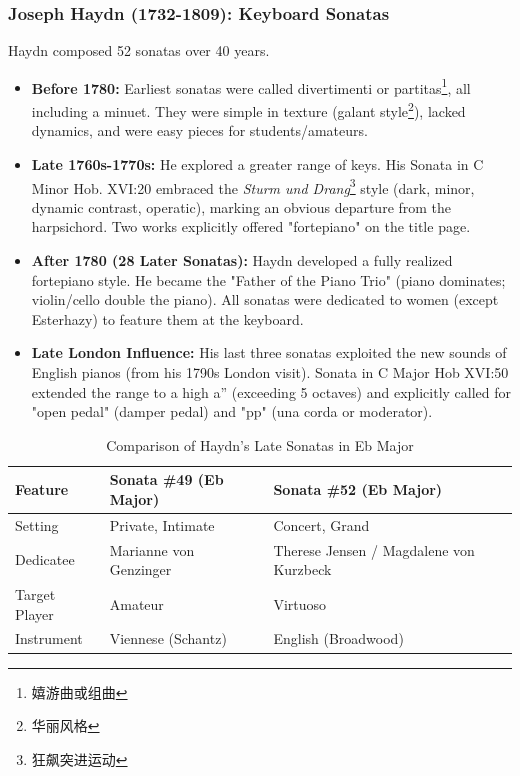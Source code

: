 \documentclass[math,code]{amznotes}
\theoremstyle{remark}
\begin{document}
\subsubsection{Joseph Haydn (1732-1809): Keyboard Sonatas}
Haydn composed 52 sonatas over 40 years.
\begin{itemize}
    \item \textbf{Before 1780:} Earliest sonatas were called divertimenti or partitas\footnote{嬉游曲或组曲}, all including a minuet. They were simple in texture (galant style\footnote{华丽风格}), lacked dynamics, and were easy pieces for students/amateurs.
    \item \textbf{Late 1760s-1770s:} He explored a greater range of keys. His Sonata in C Minor Hob. XVI:20 embraced the \textit{Sturm und Drang}\footnote{狂飙突进运动} style (dark, minor, dynamic contrast, operatic), marking an obvious departure from the harpsichord. Two works explicitly offered "fortepiano" on the title page.
    \item \textbf{After 1780 (28 Later Sonatas):} Haydn developed a fully realized fortepiano style. He became the "Father of the Piano Trio" (piano dominates; violin/cello double the piano). All sonatas were dedicated to women (except Esterhazy) to feature them at the keyboard.
    \item \textbf{Late London Influence:} His last three sonatas exploited the new sounds of English pianos (from his 1790s London visit). Sonata in C Major Hob XVI:50 extended the range to a high a'' (exceeding 5 octaves) and explicitly called for "open pedal" (damper pedal) and "pp" (una corda or moderator).
\end{itemize}

\begin{table}[h]
\centering
\begin{tabular}{|l|l|l|}
\hline
\textbf{Feature} & \textbf{Sonata \#49 (Eb Major)} & \textbf{Sonata \#52 (Eb Major)} \\ \hline
Setting & Private, Intimate & Concert, Grand \\ \hline
Dedicatee & Marianne von Genzinger & Therese Jensen / Magdalene von Kurzbeck \\ \hline
Target Player & Amateur & Virtuoso \\ \hline
Instrument & Viennese (Schantz) & English (Broadwood) \\ \hline
\end{tabular}
\caption{Comparison of Haydn's Late Sonatas in Eb Major}
\end{table}
\end{document}
